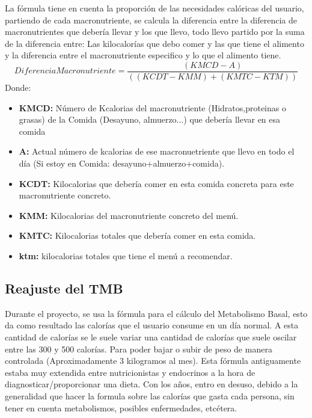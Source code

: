 La fórmula tiene en cuenta la proporción de las necesidades calóricas del usuario, partiendo de cada macronutriente, se calcula la diferencia entre la diferencia de macronutrientes que debería llevar y los que llevo, todo llevo partido por la suma de la diferencia entre: Las kilocalorías que debo comer y las que tiene el alimento y la diferencia entre el macronutriente especifico y lo que el alimento tiene.\\
\begin{equation}
DiferenciaMacronutriente = \frac{(KMCD - A)}{((KCDT-KMM)+(KMTC-KTM))}
\end{equation}
Donde:
\begin{itemize}
\item \textbf{KMCD:} Número de Kcalorias del macronutriente (Hidratos,proteinas o grasas) de la Comida (Desayuno, almuerzo...) que debería llevar en esa comida
\item \textbf{A:} Actual número de kcalorias de ese macronuetriente que llevo en todo el día (Si estoy en Comida: desayuno+almuerzo+comida).
\item \textbf{KCDT:} Kilocalorias que debería comer en esta comida concreta para este macronutriente concreto.
\item \textbf{KMM:} Kilocalorias del macronutriente concreto del menú.
\item \textbf{KMTC:} Kilocalorias totales que debería comer en esta comida.
\item \textbf{ktm:} kilocalorias totales que tiene el menú a recomendar.
\end{itemize}

\subsection{Reajuste del TMB}
Durante el proyecto, se usa la fórmula para el cálculo del Metabolismo Basal, esto da como resultado las calorías que el usuario consume en un día normal. A esta cantidad de calorías se le suele variar una cantidad de calorías que suele oscilar entre las 300 y 500 calorías. Para poder bajar o subir de peso de manera controlada (Aproximadamente 3 kilogramos al mes). Esta fórmula antiguamente estaba muy extendida entre nutricionistas y endocrinos a la hora de diagnosticar/proporcionar una dieta. Con los años, entro en desuso, debido a la generalidad que hacer la formula sobre las calorías que gasta cada persona, sin tener en cuenta metabolismos, posibles enfermedades, etcétera.\\

